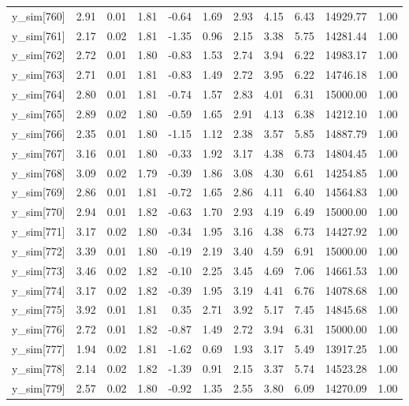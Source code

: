\begin{table}[ht]
\begin{tabular}{rrrrrrrrrrr}
  y\_sim[760] & 2.91 & 0.01 & 1.81 & -0.64 & 1.69 & 2.93 & 4.15 & 6.43 & 14929.77 & 1.00 \\ 
  y\_sim[761] & 2.17 & 0.02 & 1.81 & -1.35 & 0.96 & 2.15 & 3.38 & 5.75 & 14281.44 & 1.00 \\ 
  y\_sim[762] & 2.72 & 0.01 & 1.80 & -0.83 & 1.53 & 2.74 & 3.94 & 6.22 & 14983.17 & 1.00 \\ 
  y\_sim[763] & 2.71 & 0.01 & 1.81 & -0.83 & 1.49 & 2.72 & 3.95 & 6.22 & 14746.18 & 1.00 \\ 
  y\_sim[764] & 2.80 & 0.01 & 1.81 & -0.74 & 1.57 & 2.83 & 4.01 & 6.31 & 15000.00 & 1.00 \\ 
  y\_sim[765] & 2.89 & 0.02 & 1.80 & -0.59 & 1.65 & 2.91 & 4.13 & 6.38 & 14212.10 & 1.00 \\ 
  y\_sim[766] & 2.35 & 0.01 & 1.80 & -1.15 & 1.12 & 2.38 & 3.57 & 5.85 & 14887.79 & 1.00 \\ 
  y\_sim[767] & 3.16 & 0.01 & 1.80 & -0.33 & 1.92 & 3.17 & 4.38 & 6.73 & 14804.45 & 1.00 \\ 
  y\_sim[768] & 3.09 & 0.02 & 1.79 & -0.39 & 1.86 & 3.08 & 4.30 & 6.61 & 14254.85 & 1.00 \\ 
  y\_sim[769] & 2.86 & 0.01 & 1.81 & -0.72 & 1.65 & 2.86 & 4.11 & 6.40 & 14564.83 & 1.00 \\ 
  y\_sim[770] & 2.94 & 0.01 & 1.82 & -0.63 & 1.70 & 2.93 & 4.19 & 6.49 & 15000.00 & 1.00 \\ 
  y\_sim[771] & 3.17 & 0.02 & 1.80 & -0.34 & 1.95 & 3.16 & 4.38 & 6.73 & 14427.92 & 1.00 \\ 
  y\_sim[772] & 3.39 & 0.01 & 1.80 & -0.19 & 2.19 & 3.40 & 4.59 & 6.91 & 15000.00 & 1.00 \\ 
  y\_sim[773] & 3.46 & 0.02 & 1.82 & -0.10 & 2.25 & 3.45 & 4.69 & 7.06 & 14661.53 & 1.00 \\ 
  y\_sim[774] & 3.17 & 0.02 & 1.82 & -0.39 & 1.95 & 3.19 & 4.41 & 6.76 & 14078.68 & 1.00 \\ 
  y\_sim[775] & 3.92 & 0.01 & 1.81 & 0.35 & 2.71 & 3.92 & 5.17 & 7.45 & 14845.68 & 1.00 \\ 
  y\_sim[776] & 2.72 & 0.01 & 1.82 & -0.87 & 1.49 & 2.72 & 3.94 & 6.31 & 15000.00 & 1.00 \\ 
  y\_sim[777] & 1.94 & 0.02 & 1.81 & -1.62 & 0.69 & 1.93 & 3.17 & 5.49 & 13917.25 & 1.00 \\ 
  y\_sim[778] & 2.14 & 0.02 & 1.82 & -1.39 & 0.91 & 2.15 & 3.37 & 5.74 & 14523.28 & 1.00 \\ 
  y\_sim[779] & 2.57 & 0.02 & 1.80 & -0.92 & 1.35 & 2.55 & 3.80 & 6.09 & 14270.09 & 1.00 \\ 

\end{tabular}
\end{table}
